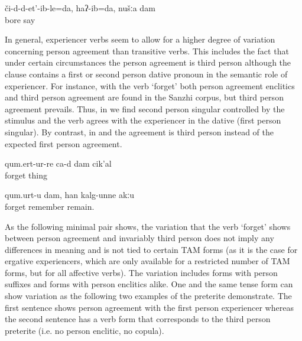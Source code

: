 \begin{exe}
	\ex	\label{ex:You (pl.) bored me, I said}
	\gll	či-d-d-et'-ib-le=da,	haʔ-ib=da,	nušːa	dam\\
		bore	say		\\
	\glt	{}
\end{exe}


In general, experiencer verbs seem to allow for a higher degree of variation concerning person agreement than transitive verbs. This includes the fact that under certain circumstances the person agreement is third person although the clause contains a first or second person dative pronoun in the semantic role of experiencer. For instance, with the verb `forget' both person agreement enclitics and third person agreement are found in the Sanzhi corpus, but third person agreement prevails. Thus, in  we find second person singular controlled by the stimulus and  the verb agrees with the experiencer in the dative (first person singular). By contrast, in  and  the agreement is third person instead of the expected first person agreement. 
%

\begin{exe}
	\ex	\label{ex:I forgot everythingA}
	\gll	qum.ert-ur-re	ca-d	dam	cik'al\\
		forget			thing\\
	\glt	{}
	
		\ex	\label{ex:I forget (it), I do not remember it.}
	\gll	qum.urt-u dam, han kalg-unne akːu\\
		forget		remember remain. \\
	\glt	{}
	
\end{exe}

As the following minimal pair shows, the variation that the verb `forget' shows between person agreement and invariably third person does not imply any differences in meaning and is not tied to certain TAM forms (as it is the case for ergative experiencers, which are only available for a restricted number of TAM forms, but for all affective verbs). The variation includes forms with person suffixes and forms with person enclitics alike. One and the same tense form can show variation as the following two examples of the preterite demonstrate. The first sentence  shows person agreement with the first person experiencer whereas the second sentence  has a verb form that corresponds to the third person preterite (i.e. no person enclitic, no copula). 

